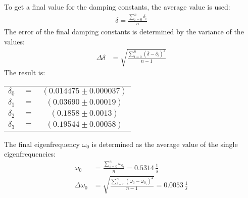 To get a final value for the damping constants, the average value is used:
\begin{align}
\delta = \frac{\sum_{i=0}^n \delta_i}{n}
\end{align}
The error of the final damping constants is determined by the variance of the values:
\begin{align}
\Delta\delta &= \sqrt{\frac{\sum_{i=0}^n \left( \bar{\delta} -\delta_i\right)^2 }{n-1}}
\end{align}
The result is:
\begin{center}
\begin{tabular}{ccc}
\(\delta_0\) & \(=\) &\(\left(0.014475 \pm 0.000037 \right)\)\\
\(\delta_1\) & \(=\) &\(\left(0.03690 \pm 0.00019 \right)\)\\
\(\delta_2\) & \(=\) &\(\left(0.1858 \pm 0.0013 \right)\)\\
\(\delta_3\) & \(=\) &\(\left(0.19544 \pm 0.00058 \right)\)
\end{tabular}
\end{center}
The final eigenfrequency \(\omega_0\) is determined as the average value of the single eigenfrequencies:
\begin{align}
\omega_0 &= \frac{\sum_{i=0}^n \omega_{0_i}}{n} = 0.5314 \, \frac{1}{s}\\
\Delta \omega_0 &= \sqrt{\frac{\sum_{i=0}^n \left( \omega_0 -\omega_{0_i}\right)^2 }{n-1}} = 0.0053\, \frac{1}{s}
\end{align}